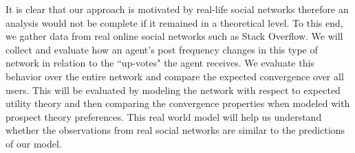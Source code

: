 \documentclass[A4paper,11pt]{article}
\begin{document}
\par It is clear that our approach is motivated by real-life social networks therefore an analysis would not be complete
if it remained in a theoretical level. To this end, we gather data from real online social networks such as Stack Overflow. We
will collect and evaluate how an agent's post frequency changes in this type of network in relation to the ``up-votes" the agent
receives. We evaluate this behavior over the entire network and compare the expected convergence over all users.  This will be
evaluated by modeling the network with respect to expected utility theory and then comparing the convergence properties when
modeled with prospect theory preferences. This real world model will help us understand whether the observations from real social
networks are similar to the predictions of our model.

\label{Bibliography}




\end{document}
